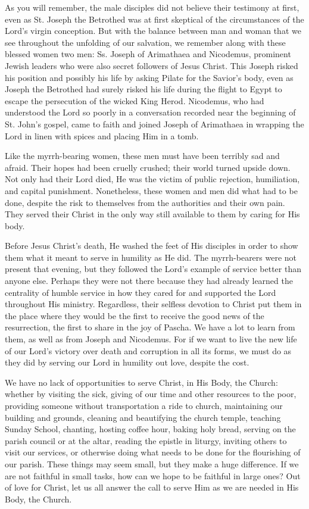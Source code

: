 \documentclass[twoside, letterpaper, 12pt]{report}
\begin{document}
\begin{maybetwocolumns}
As you will remember, the male disciples did not believe their testimony at first, even as St. Joseph
the Betrothed was at first skeptical of the circumstances of the Lord’s virgin conception. But with
the balance between man and woman that we see throughout the unfolding of our salvation, we
remember along with these blessed women two men: Ss. Joseph of Arimathaea and Nicodemus,
prominent Jewish leaders who were also secret followers of Jesus Christ. This Joseph risked his
position and possibly his life by asking Pilate for the Savior’s body, even as Joseph the Betrothed
had surely risked his life during the flight to Egypt to escape the persecution of the wicked King
Herod. Nicodemus, who had understood the Lord so poorly in a conversation recorded near the
beginning of St. John’s gospel, came to faith and joined Joseph of Arimathaea in wrapping the
Lord in linen with spices and placing Him in a tomb.

Like the myrrh-bearing women, these men must have been terribly sad and afraid. Their hopes
had been cruelly crushed; their world turned upside down. Not only had their Lord died, He was
the victim of public rejection, humiliation, and capital punishment. Nonetheless, these women and
men did what had to be done, despite the risk to themselves from the authorities and their own
pain. They served their Christ in the only way still available to them by caring for His body.

Before Jesus Christ’s death, He washed the feet of His disciples in order to show them what it
meant to serve in humility as He did. The myrrh-bearers were not present that evening, but they
followed the Lord’s example of service better than anyone else. Perhaps they were not there
because they had already learned the centrality of humble service in how they cared for and
supported the Lord throughout His ministry. Regardless, their selfless devotion to Christ put them
in the place where they would be the first to receive the good news of the resurrection, the first to
share in the joy of Pascha. We have a lot to learn from them, as well as from Joseph and
Nicodemus. For if we want to live the new life of our Lord’s victory over death and corruption in
all its forms, we must do as they did by serving our Lord in humility out love, despite the cost.

We have no lack of opportunities to serve Christ, in His Body, the Church: whether by visiting the
sick, giving of our time and other resources to the poor, providing someone without transportation
a ride to church, maintaining our building and grounds, cleaning and beautifying the church
temple, teaching Sunday School, chanting, hosting coffee hour, baking holy bread, serving on the
parish council or at the altar, reading the epistle in liturgy, inviting others to visit our services, or
otherwise doing what needs to be done for the flourishing of our parish. These things may seem
small, but they make a huge difference. If we are not faithful in small tasks, how can we hope to
be faithful in large ones? Out of love for Christ, let us all answer the call to serve Him as we are
needed in His Body, the Church.


\end{maybetwocolumns}
\end{document}
